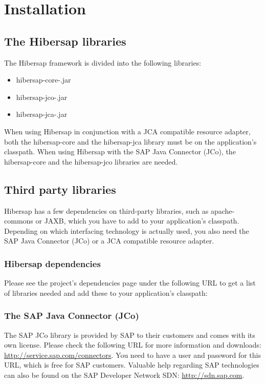\chapter{Installation}
\label{cha:Installation}

\section{The Hibersap libraries}

The Hibersap framework is divided into the following libraries:
\begin{itemize}
  \item hibersap-core-\HibersapVersion.jar
  \item hibersap-jco-\HibersapVersion.jar
  \item hibersap-jca-\HibersapVersion.jar
\end{itemize}

When using Hibersap in conjunction with a JCA compatible resource adapter, both the hibersap-core and the hibersap-jca library must be on the application's classpath. When using Hibersap with the SAP Java Connector (JCo), the hibersap-core and the hibersap-jco libraries are needed. 

\section{Third party libraries}
Hibersap has a few dependencies on third-party libraries, such as apache-commons or JAXB, which you have to add to your application's classpath. Depending on which interfacing technology is actually used, you also need the SAP Java Connector (JCo) or a JCA compatible resource adapter.

\subsection{Hibersap dependencies}
Please see the project's dependencies page under the following URL to get a list of libraries needed and add these to your application's classpath: \urlHibersapDependencies

\subsection{The SAP Java Connector (JCo)}
The SAP JCo library is provided by SAP to their customers and comes with its own license. Please check the following URL for more information and downloads: \url{http://service.sap.com/connectors}. You need to have a user and password for this URL, which is free for SAP customers. Valuable help regarding SAP technologies can also be found on the SAP Developer Network SDN: \url{http://sdn.sap.com}. 

